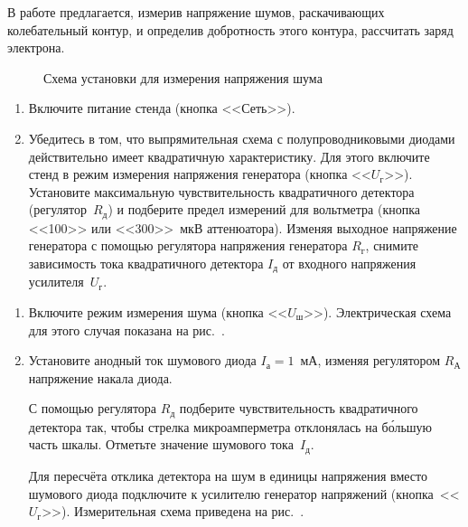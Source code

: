 \begin{lab:task}
В работе предлагается, измерив напряжение шумов, раскачивающих колебательный
контур, и определив добротность этого
контура, рассчитать заряд электрона.

\begin{figure}[h!]
	\caption{Схема установки для измерения напряжения шума}
\end{figure}

\begin{enumerate}

	\item Включите питание стенда (кнопка <<Сеть>>).

	\item Убедитесь в том, что выпрямительная схема с полупроводниковыми диодами
действительно имеет квадратичную
характеристику. Для этого включите стенд в режим измерения напряжения генератора
(кнопка <<$U_{\text{г}}$>>). Установите
максимальную  чувствительность квадратичного детектора
(регулятор~$R_{\text{д}}$) и подберите предел измерений для вольтметра
(кнопка <<100>> или <<300>>~мкВ аттенюатора). Изменяя выходное напряжение
генератора с помощью регулятора напряжения
генератора $R_{г}$, снимите зависимость тока квадратичного детектора
$I_{\text{д}}$ от входного напряжения усилителя~$U_{\text{г}}$.

\end{enumerate}


\begin{enumerate}
	\item Включите режим измерения шума (кнопка <<$U_{ш}$>>).
Электрическая схема для этого случая показана на рис.~.

	\item Установите анодный ток шумового диода $I_{а}=1$~мА, изменяя
регулятором $R_{А}$ напряжение накала диода.

С помощью регулятора $R_{д}$ подберите чувствительность квадратичного
детектора так, чтобы стрелка микроамперметра
отклонялась на б\'{о}льшую часть шкалы. Отметьте значение шумового
тока~$I_{д}$.

Для пересчёта отклика детектора на шум в единицы напряжения вместо шумового
диода подключите к усилителю генератор напряжений (кнопка~<<$U_{г}$>>).
Измерительная схема приведена на рис.~.


\end{enumerate}
\end{lab:task}
